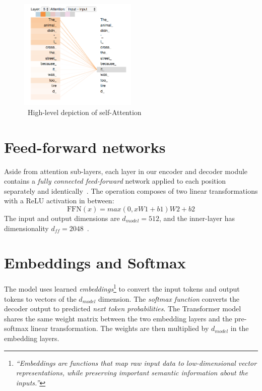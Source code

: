 \begin{figure}
    \centering
    \includegraphics[width=0.5\textwidth]{assets/self-attention}
    \caption{~High-level depiction of self-Attention~\cite{illustrated-transformer}}\label{fig:self-attention}
\end{figure}

\section{Feed-forward networks}\label{sec:feed-forward-networks}

Aside from attention sub-layers, each layer in our encoder and decoder module contains a \textit{fully connected feed-forward} network applied to each position separately and identically~\cite{attention-is-all-you-need}.
The operation composes of two linear transformations with a ReLU activation in between:
\[
    \text{FFN}(x) = max(0, xW1 + b1)W2 + b2
\]
The input and output dimensions are $d_{model} = 512$, and the inner-layer has dimensionality $d_{ff} = 2048$~\cite{attention-is-all-you-need}.

\section{Embeddings and Softmax}\label{sec:embeddings-and-softmax}

The model uses learned \textit{embeddings}\footnote{\textit{``Embeddings are functions that map raw input data to low-dimensional vector representations, while preserving important semantic information about the inputs.''}\cite{embeddings}} to convert the input tokens and output tokens to vectors of the $d_{model}$ dimension.
The \textit{softmax function} converts the decoder output to predicted \textit{next token probabilities}.
The Transformer model shares the same weight matrix between the two embedding layers and the pre-softmax linear transformation.
The weights are then multiplied by $d_{model}$ in the embedding layers.~\cite{attention-is-all-you-need}

